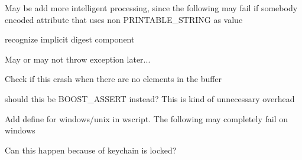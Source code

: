 
\begin{DoxyRefList}
\item[\label{todo__todo000006}%
\hypertarget{todo__todo000006}{}%
Member \hyperlink{classndn_1_1CertificateSubjectDescription_a9a4b924eac644c0ca0cf209f06d81931}{ndn\+:\+:Certificate\+Subject\+Description\+:\+:decode} (Crypto\+P\+P\+::\+Buffered\+Transformation \&in)]May be add more intelligent processing, since the following may fail if somebody encoded attribute that uses non P\+R\+I\+N\+T\+A\+B\+L\+E\+\_\+\+S\+T\+R\+I\+NG as value  
\item[\label{todo__todo000001}%
\hypertarget{todo__todo000001}{}%
Member \hyperlink{classndn_1_1Interest_a625e8ed587c87bdb236b15395fdd3067}{ndn\+:\+:Interest\+:\+:matches\+Data} (const \hyperlink{classndn_1_1Data}{Data} \&data) const]recognize implicit digest component  
\item[\label{todo__todo000004}%
\hypertarget{todo__todo000004}{}%
Member \hyperlink{classndn_1_1MetaInfo_a17dc52b30e227d97f3e31394c013c1fa}{ndn\+:\+:Meta\+Info\+:\+:wire\+Decode} (const \hyperlink{classndn_1_1Block}{Block} \&wire)]May or may not throw exception later...  
\item[\label{todo__todo000005}%
\hypertarget{todo__todo000005}{}%
Member \hyperlink{classndn_1_1Name_aa27048ff1455eddcda4462049118a27b}{ndn\+:\+:Name\+:\+:end} () const]Check if this crash when there are no elements in the buffer  
\item[\label{todo__todo000003}%
\hypertarget{todo__todo000003}{}%
Member \hyperlink{classndn_1_1nfd_1_1LocalControlHeader_a04deac705d2498eaee39908230b994a8}{ndn\+:\+:nfd\+:\+:Local\+Control\+Header\+:\+:wire\+Encode} (const U \&payload, uint8\+\_\+t encode\+Mask=E\+N\+C\+O\+D\+E\+\_\+\+A\+LL) const]should this be B\+O\+O\+S\+T\+\_\+\+A\+S\+S\+E\+RT instead? This is kind of unnecessary overhead  
\item[\label{todo__todo000009}%
\hypertarget{todo__todo000009}{}%
Member \hyperlink{classndn_1_1SecPublicInfoSqlite3_a55544ffecf1ee7fc4a95d20f469f151f}{ndn\+:\+:Sec\+Public\+Info\+Sqlite3\+:\+:Sec\+Public\+Info\+Sqlite3} (const std\+::string \&dir=\char`\"{}\char`\"{})]Add define for windows/unix in wscript. The following may completely fail on windows  
\item[\label{todo__todo000010}%
\hypertarget{todo__todo000010}{}%
Member \hyperlink{classndn_1_1SecTpmOsx_aef0df910b9559aa9eda0c36985508c53}{ndn\+:\+:Sec\+Tpm\+Osx\+:\+:export\+Private\+Key\+Pkcs8\+From\+Tpm\+Internal} (const \hyperlink{classndn_1_1Name}{Name} \&key\+Name, bool need\+Retry)]Can this happen because of keychain is locked?  

\end{DoxyRefList}
